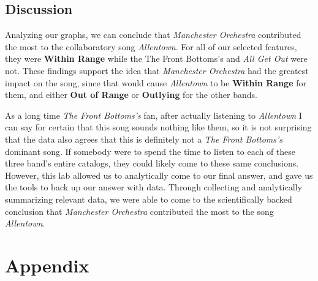 \documentclass{article}\usepackage[]{graphicx}\usepackage[]{xcolor}
\begin{document}
\begin{multicols}{2}
\section{Discussion}
Analyzing our graphs, we can conclude that \textit{Manchester Orchestra} contributed the most to the collaboratory song \textit{Allentown}. For all of our selected features, they were \textbf{Within Range} while the {The Front Bottoms's} and \textit{All Get Out} were not. These findings support the idea that \textit{Manchester Orchestra} had the greatest impact on the song, since that would cause \textit{Allentown} to be \textbf{Within Range} for them, and either \textbf{Out of Range} or \textbf{Outlying} for the other bands. 
\par\indent
As a long time \textit{The Front Bottoms's} fan, after actually listening to \textit{Allentown} I can say for certain that this song sounds nothing like them, so it is not surprising that the data also agrees that this is definitely not a \textit{The Front Bottoms's} dominant song. If somebody were to spend the time to listen to each of these three band's entire catalogs, they could likely come to these same conclusions. However, this lab allowed us to analytically come to our final answer, and gave us the tools to back up our answer with data. Through collecting and analytically summarizing relevant data, we were able to come to the scientifically backed conclusion that \textit{Manchester Orchestra} contributed the most to the song \textit{Allentown}.

\nocite{jsonlite}
\nocite{stringr}
\nocite{tidyverse}
\nocite{Essentia}
\nocite{Essentia2}
\nocite{Song}
\nocite{Shiny}
\nocite{LIWC}


\vspace{2em}
\begin{tiny}

\end{tiny}
\end{multicols}

\section{Appendix}
\end{document}
